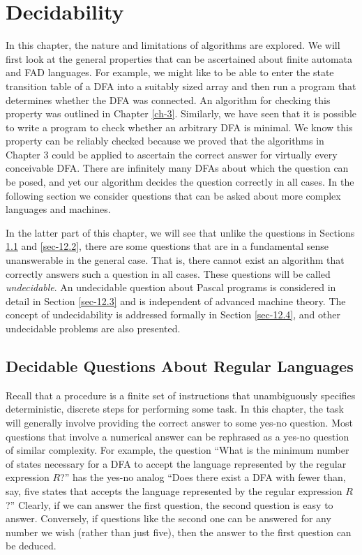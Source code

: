 \chapter{Decidability}\label{ch-12}

In this chapter, the nature and limitations of algorithms are
explored. We will first look at the general properties that can be
ascertained about finite automata and FAD languages. For example,
we might like to be able to enter the state transition table of a
DFA into a suitably sized array and then run a program that determines
whether the DFA was connected. An algorithm for checking this
property was outlined in Chapter \ref{ch-3}. Similarly, we have seen that
it is possible to write a program to check whether an arbitrary DFA
is minimal. We know this property can be reliably checked because
we proved that the algorithms in Chapter 3 could be applied to
ascertain the correct answer for virtually every conceivable DFA.
There are infinitely many DFAs about which the question can
be posed, and yet our algorithm decides the question correctly in
all cases. In the following section we consider questions that can
be asked about more complex languages and machines.

%
%

In the latter part of this chapter, we will see that unlike the questions in
Sections \ref{sec-12.1} and \ref{sec-12.2}, there are some questions that are in
a fundamental sense unanswerable in the general case. That is, there cannot
exist an algorithm that correctly answers such a question in all cases. These
questions will be called \emph{undecidable}. An undecidable question about Pascal
programs is considered in detail in Section \ref{sec-12.3} and is independent of
advanced machine theory. The concept of undecidability is addressed formally in
Section \ref{sec-12.4}, and other undecidable problems are also presented.

\section{Decidable Questions About Regular Languages}\label{sec-12.1}

Recall that a procedure is a finite set of instructions that
unambiguously specifies deterministic, discrete steps for performing
some task. In this chapter, the task will generally involve providing
the correct answer to some yes-no question. Most questions that
involve a numerical answer can be rephrased as a yes-no question
of similar complexity. For example, the question ``What is the minimum
number of states necessary for a DFA to accept the language represented
by the regular expression $R$?'' has the yes-no analog ``Does there
exist a DFA with fewer than, say, five states that accepts the
language represented by the regular expression $R$?'' Clearly, if we
can answer the first question, the second question is easy to answer.
Conversely, if questions like the second one can be answered for
any number we wish (rather than just five), then the answer to the
first question can be deduced.


